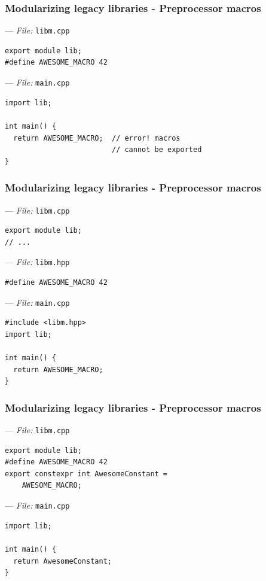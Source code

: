 \documentclass[aspectratio=169]{beamer}
\begin{document}
\begin{frame}[fragile]
  \frametitle{Modularizing legacy libraries - Preprocessor macros}

  --- \textit{File:} \texttt{libm.cpp}
  \begin{lstlisting}[style=cpp20]
export module lib;
#define AWESOME_MACRO 42
  \end{lstlisting}

  --- \textit{File:} \texttt{main.cpp}
  \begin{lstlisting}[style=cpp20]
import lib;

int main() {
  return AWESOME_MACRO;  // error! macros
                         // cannot be exported
}
  \end{lstlisting}

\end{frame}

\begin{frame}[fragile]
  \frametitle{Modularizing legacy libraries - Preprocessor macros}

  --- \textit{File:} \texttt{libm.cpp}
  \begin{lstlisting}[style=cpp20]
export module lib;
// ...
  \end{lstlisting}

  --- \textit{File:} \texttt{libm.hpp}
    \begin{lstlisting}[style=cpp20]
#define AWESOME_MACRO 42
  \end{lstlisting}

  --- \textit{File:} \texttt{main.cpp}
  \begin{lstlisting}[style=cpp20]
#include <libm.hpp>
import lib;

int main() {
  return AWESOME_MACRO;
}
  \end{lstlisting}

\end{frame}


\begin{frame}[fragile]
  \frametitle{Modularizing legacy libraries - Preprocessor macros}

  --- \textit{File:} \texttt{libm.cpp}
  \begin{lstlisting}[style=cpp20]
export module lib;
#define AWESOME_MACRO 42
export constexpr int AwesomeConstant =
    AWESOME_MACRO;
  \end{lstlisting}

  --- \textit{File:} \texttt{main.cpp}
  \begin{lstlisting}[style=cpp20]
import lib;

int main() {
  return AwesomeConstant;
}
  \end{lstlisting}

\end{frame}
\end{document}
